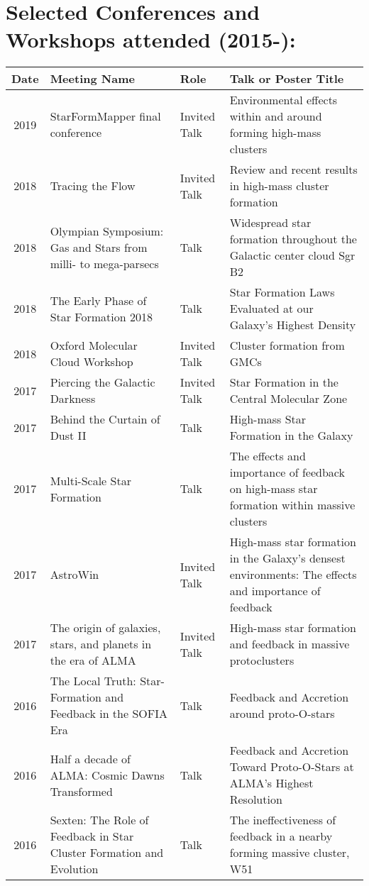 \setlength{\extrarowheight}{4pt}
\section*{Selected Conferences and Workshops attended (2015-): }
\vspace{-12pt}
\begin{tabular}{cp{1.8in}p{1.5cm}p{3.0in}}
    Date & Meeting Name & Role & Talk or Poster Title \\
                \hline
    2019 &      StarFormMapper final conference & Invited Talk & Environmental effects within and around forming high-mass clusters \\
    2018 &      Tracing the Flow & Invited Talk & Review and recent results in high-mass cluster formation \\
    2018 &      Olympian Symposium: Gas and Stars from milli- to mega-parsecs & Talk & 	Widespread star formation throughout the Galactic center cloud Sgr B2 \\
    2018 &      The Early Phase of Star Formation 2018 & Talk & Star Formation Laws Evaluated at our Galaxy's Highest Density \\
    2018 &      Oxford Molecular Cloud Workshop & Invited Talk & Cluster formation from GMCs \\
    2017 &      Piercing the Galactic Darkness & Invited Talk & Star Formation in the Central Molecular Zone \\
    2017 &      Behind the Curtain of Dust II & Talk & High-mass Star Formation in the Galaxy \\
    2017 &      Multi-Scale Star Formation & Talk & The effects and importance of feedback on high-mass star formation within massive clusters \\
    2017 &      AstroWin & Invited Talk & High-mass star formation in the Galaxy's densest environments: The effects and importance of feedback\\
    2017 &      The origin of galaxies, stars, and planets in the era of ALMA & Invited Talk & High-mass star formation and feedback in massive protoclusters \\
    2016 &      The Local Truth: Star-Formation and Feedback in the SOFIA Era & Talk & Feedback and Accretion around proto-O-stars \\
    2016 &      Half a decade of ALMA: Cosmic Dawns Transformed & Talk & Feedback and Accretion Toward Proto-O-Stars at ALMA's Highest Resolution \\
    2016 &      Sexten: The Role of Feedback in Star Cluster Formation and Evolution  & Talk & The ineffectiveness of feedback in a nearby forming massive cluster, W51 \\

\end{tabular}
